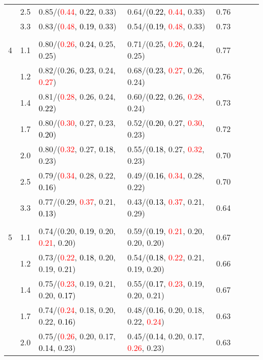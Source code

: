 \documentclass[10pt,a4paper]{report}
\begin{document}
\begin{table}[!htbp]
\begin{center}
{\begin{tabular}{ccllcccc}
			&2.5&0.85/(\textcolor{red}{0.44}, \textcolor{black}{0.22}, 0.33)&0.64/(\textcolor{black}{0.22}, \textcolor{red}{0.44}, 0.33)&0.76\\
			&3.3&0.83/(\textcolor{red}{0.48}, \textcolor{black}{0.19}, 0.33)&0.54/(\textcolor{black}{0.19}, \textcolor{red}{0.48}, 0.33)&0.73\\
			&&&&\\
			4			&1.1&0.80/(\textcolor{red}{0.26}, \textcolor{black}{0.24}, 0.25, 0.25)&0.71/(0.25, \textcolor{red}{0.26}, \textcolor{black}{0.24}, 0.25)&0.77\\
			&1.2&0.82/(0.26, \textcolor{black}{0.23}, 0.24, \textcolor{red}{0.27})&0.68/(\textcolor{black}{0.23}, \textcolor{red}{0.27}, 0.26, 0.24)&0.76\\
			&1.4&0.81/(\textcolor{red}{0.28}, 0.26, 0.24, \textcolor{black}{0.22})&0.60/(\textcolor{black}{0.22}, 0.26, \textcolor{red}{0.28}, 0.24)&0.73\\
			&1.7&0.80/(\textcolor{red}{0.30}, 0.27, 0.23, \textcolor{black}{0.20})&0.52/(\textcolor{black}{0.20}, 0.27, \textcolor{red}{0.30}, 0.23)&0.72\\
			&2.0&0.80/(\textcolor{red}{0.32}, 0.27, \textcolor{black}{0.18}, 0.23)&0.55/(\textcolor{black}{0.18}, 0.27, \textcolor{red}{0.32}, 0.23)&0.70\\
			&2.5&0.79/(\textcolor{red}{0.34}, 0.28, 0.22, \textcolor{black}{0.16})&0.49/(\textcolor{black}{0.16}, \textcolor{red}{0.34}, 0.28, 0.22)&0.70\\
			&3.3&0.77/(0.29, \textcolor{red}{0.37}, 0.21, \textcolor{black}{0.13})&0.43/(\textcolor{black}{0.13}, \textcolor{red}{0.37}, 0.21, 0.29)&0.64\\
			&&&&\\
			5			&1.1&0.74/(0.20, \textcolor{black}{0.19}, 0.20, \textcolor{red}{0.21}, 0.20)&0.59/(\textcolor{black}{0.19}, \textcolor{red}{0.21}, 0.20, 0.20, 0.20)&0.67\\
			&1.2&0.73/(\textcolor{red}{0.22}, \textcolor{black}{0.18}, 0.20, 0.19, 0.21)&0.54/(\textcolor{black}{0.18}, \textcolor{red}{0.22}, 0.21, 0.19, 0.20)&0.66\\
			&1.4&0.75/(\textcolor{red}{0.23}, 0.19, 0.21, 0.20, \textcolor{black}{0.17})&0.55/(\textcolor{black}{0.17}, \textcolor{red}{0.23}, 0.19, 0.20, 0.21)&0.67\\
			&1.7&0.74/(\textcolor{red}{0.24}, 0.18, 0.20, 0.22, \textcolor{black}{0.16})&0.48/(\textcolor{black}{0.16}, 0.20, 0.18, 0.22, \textcolor{red}{0.24})&0.63\\
			&2.0&0.75/(\textcolor{red}{0.26}, 0.20, 0.17, \textcolor{black}{0.14}, 0.23)&0.45/(\textcolor{black}{0.14}, 0.20, 0.17, \textcolor{red}{0.26}, 0.23)&0.63\\

\end{tabular}}
\end{center}
\end{table}
\end{document}
